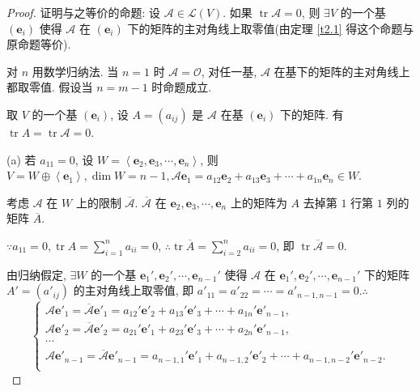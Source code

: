 \documentclass{ctexart}
\begin{document}
\begin{proof}
    证明与之等价的命题: 设 $\mathcal{A}\in\mathcal{L}(V)$. 如果 $\operatorname{tr}\mathcal{A}=0$, 则 $\exists V$ 的一个基 $(\boldsymbol{e}_i)$ 使得 $\mathcal{A}$ 在 $(\boldsymbol{e}_i)$ 下的矩阵的主对角线上取零值(由定理 \ref{t2.1} 得这个命题与原命题等价).

    对 $n$ 用数学归纳法. 当 $n=1$ 时 $\mathcal{A}=\mathcal{O}$, 对任一基, $\mathcal{A}$ 在基下的矩阵的主对角线上都取零值. 假设当 $n=m-1$ 时命题成立.

    取 $V$ 的一个基 $(\boldsymbol{e}_i)$, 设 $A=(a_{ij})$ 是 $\mathcal{A}$ 在基 $(\boldsymbol{e}_i)$ 下的矩阵. 有 $\operatorname{tr}A=\operatorname{tr}\mathcal{A}=0$.

    (a) 若 $a_{11}=0$, 设 $W=\left<\boldsymbol{e}_2,\boldsymbol{e}_3,\cdots,\boldsymbol{e}_n\right>$, 则 $V=W\oplus\left<\boldsymbol{e}_1\right>,\dim W=n-1,\mathcal{A}\boldsymbol{e}_1=a_{12}\boldsymbol{e}_2+a_{13}\boldsymbol{e}_3+\cdots+a_{1n}\boldsymbol{e}_n\in W$.
    
    考虑 $\mathcal{A}$ 在 $W$ 上的限制 $\overline{\mathcal{A}}$. $\overline{\mathcal{A}}$ 在 $\boldsymbol{e}_2,\boldsymbol{e}_3,\cdots,\boldsymbol{e}_n$ 上的矩阵为 $A$ 去掉第 $1$ 行第 $1$ 列的矩阵 $\overline{A}$.
    
    $\because a_{11}=0,\operatorname{tr}A=\sum\limits_{i=1}^na_{ii}=0$, $\therefore\operatorname{tr}\overline{A}=\sum\limits_{i=2}^na_{ii}=0$, 即 $\operatorname{tr}\overline{\mathcal{A}}=0$.
    
    由归纳假定, $\exists W$ 的一个基 $\boldsymbol{e}_1',\boldsymbol{e}_2',\cdots,\boldsymbol{e}_{n-1}'$ 使得 $\mathcal{A}$ 在 $\boldsymbol{e}_1',\boldsymbol{e}_2',\cdots,\boldsymbol{e}_{n-1}'$ 下的矩阵 $A'=(a'_{ij})$ 的主对角线上取零值, 即 $a'_{11}=a'_{22}=\cdots=a'_{n-1,n-1}=0.\therefore$
    \[\begin{cases}
        \mathcal{A}\boldsymbol{e}'_1=\overline{\mathcal{A}}\boldsymbol{e}'_1=a_{12}'\boldsymbol{e}'_2+a_{13}'\boldsymbol{e}'_3+\cdots+a_{1n}'\boldsymbol{e}'_{n-1}, \\
        \mathcal{A}\boldsymbol{e}'_2=\overline{\mathcal{A}}\boldsymbol{e}'_2=a_{21}'\boldsymbol{e}'_1+a_{23}'\boldsymbol{e}'_3+\cdots+a_{2n}'\boldsymbol{e}'_{n-1}, \\
        \cdots \\
        \mathcal{A}\boldsymbol{e}'_{n-1}=\overline{\mathcal{A}}\boldsymbol{e}'_{n-1}=a_{n-1,1}'\boldsymbol{e}'_1+a_{n-1,2}'\boldsymbol{e}'_2+\cdots+a_{n-1,n-2}'\boldsymbol{e}'_{n-2}. \\
    \end{cases}\]
    

\end{proof}
\end{document}
